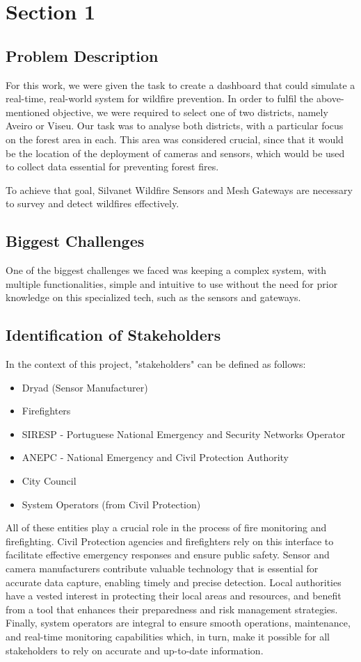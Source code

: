 \chapter{Section 1} \label{section1}
\section{Problem Description}
For this work, we were given the task to create a dashboard 
that could simulate a real-time, real-world system for wildfire 
prevention. In order to fulfil the above-mentioned objective, we were required to select one of two districts, namely Aveiro or Viseu. Our task was to analyse both districts, with a particular focus on the forest area in each. This area was considered crucial, since that it would be the location of the deployment of cameras and sensors, which would be used to collect data essential for preventing forest fires. \par
To achieve
that goal, Silvanet Wildfire Sensors and Mesh Gateways are necessary to
survey and detect wildfires effectively. 
\section{Biggest Challenges}
One of the biggest challenges we faced was keeping a complex system, with multiple functionalities, simple
and intuitive to use without the need for prior knowledge on this
specialized tech, such as the sensors and gateways. 
\section{Identification of Stakeholders}
In the context of this project, "stakeholders" can be defined as follows:
\begin{itemize}
    \item Dryad (Sensor Manufacturer)
    \item Firefighters
    \item SIRESP - Portuguese National Emergency 
    and Security Networks Operator 
    \item ANEPC - National Emergency and Civil Protection Authority
    \item City Council
    \item System Operators (from Civil Protection)
\end{itemize} \par 
All of these entities play a crucial role in the process of fire monitoring and firefighting. 
Civil Protection agencies and firefighters rely on this 
interface to facilitate effective emergency responses and 
ensure public safety. Sensor and camera manufacturers contribute 
valuable technology that is essential for accurate data capture, 
enabling timely and precise detection. Local authorities have 
a vested interest in protecting their local areas and resources, 
and benefit from a tool that enhances their preparedness and 
risk management strategies. Finally, system operators are integral 
to ensure smooth operations, maintenance, and real-time monitoring 
capabilities which, in turn, make it possible for all stakeholders 
to rely on accurate and up-to-date information. 
